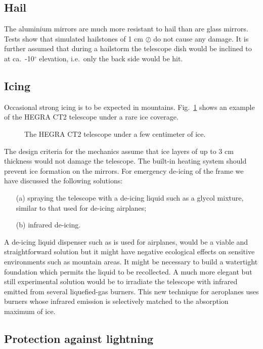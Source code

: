 \subsection{Hail}

\medskip The aluminium mirrors are much more resistant to hail than are glass
mirrors. Tests show that simulated hailstones of 1 cm $\oslash$ do not cause
any damage. It is further assumed that during a hailstorm the telescope dish
would be inclined to at ca.\, -10$^{\circ}$ elevation, i.e.\, only the back side
would be hit.

\subsection{Icing}

\medskip Occasional strong icing is to be expected in mountains. 
Fig.~\ref{fig-ice} shows an example of the HEGRA CT2 telescope under
a rare ice coverage.
\begin{figure}[htb]
\leavevmode
\centering
\epsfxsize=13cm
\caption{The HEGRA CT2 telescope under a few centimeter of ice.}
\label{fig-ice}
\end{figure}
The design criteria
for the mechanics assume that ice layers of up to 3 cm thickness would not
damage the telescope. The built-in heating system should prevent ice
formation on the mirrors. For emergency de-icing of the frame we have
discussed the following solutions:

\begin{itemize}
\item[(a)]  spraying the telescope with a de-icing liquid such as a glycol
mixture, similar to that used for de-icing airplanes;

\item[(b)]  infrared de-icing.
\end{itemize}

A de-icing liquid dispenser such as is used for airplanes, would be a viable
and straightforward solution but it might have negative ecological effects
on sensitive environments such as mountain areas. It might be necessary to
build a watertight foundation which permits the liquid to be recollected. A
much more elegant but still experimental solution would be to irradiate the
telescope with infrared emitted from several liquefied-gas burners. This new
technique for aeroplanes uses burners whose infrared emission is selectively
matched to the absorption maximum of ice.

\subsection{Protection against lightning}

